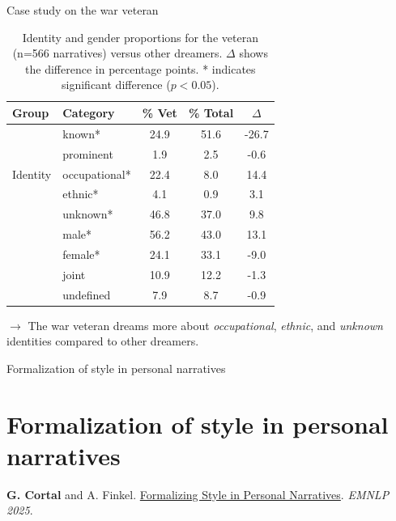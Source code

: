 \documentclass[10pt]{beamer}
\begin{document}
\begin{frame}{Case study on the war veteran}
  \begin{table}
    \centering
    \begin{tabular}{llccc}
\textbf{Group} & \textbf{Category} & \textbf{\% Vet} & \textbf{\% Total} & \textbf{$\Delta$} \\
\midrule
\multirow{5}{*}{Identity} & known* & 24.9 & 51.6 & -26.7 \\
& prominent & 1.9 & 2.5 & -0.6 \\
& occupational* & 22.4 & 8.0 & 14.4 \\
& ethnic* & 4.1 & 0.9 & 3.1 \\
& unknown* & 46.8 & 37.0 & 9.8 \\
\addlinespace
\multirow{4}{*}{Gender} & male* & 56.2 & 43.0 & 13.1 \\
& female* & 24.1 & 33.1 & -9.0 \\
& joint & 10.9 & 12.2 & -1.3 \\
& undefined & 7.9 & 8.7 & -0.9 \\
\end{tabular}
\caption{Identity and gender proportions for the veteran (n=566 narratives) versus other dreamers. $\Delta$ shows the difference in percentage points. * indicates significant difference ($p < 0.05$).}
\label{tab:case_study_war_veteran}
\end{table}

\pause

$\rightarrow$ The war veteran dreams more about \textit{occupational}, \textit{ethnic}, and \textit{unknown} identities compared to other dreamers.

\end{frame}


\begin{frame}{}
\Large
\begin{center}
    Formalization of style in personal narratives
    \section{Formalization of style in personal narratives}
\end{center}

\vspace{1.5cm}

\footnotesize

\textbf{G. Cortal} and A. Finkel. \href{https://gustavecortal.com/data/Formalizing_Style_in_Personal_Narratives.pdf}{Formalizing Style in Personal Narratives}. \textit{EMNLP 2025}.
\end{frame}
\end{document}
